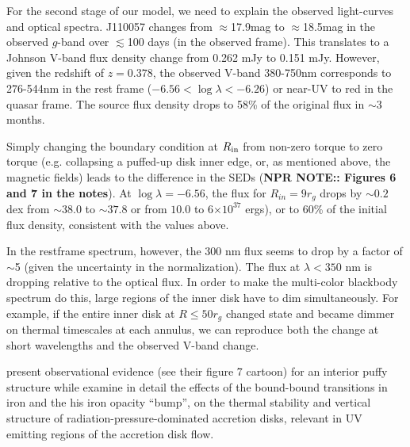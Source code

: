 \documentclass[11pt,a4paper]{article}
\begin{document}
For the second stage of our model, we need to explain the
observed light-curves and optical spectra. J110057 changes from
$\approx$17.9mag to $\approx$18.5mag in the observed $g$-band over
$\lesssim$100 days (in the observed frame).  This translates to a
Johnson V-band flux density change from 0.262 mJy to 0.151 mJy.
However, given the redshift of $z=0.378$, the observed V-band
380-750nm corresponds to 276-544nm in the rest frame ($-6.56 < \log
\lambda < -6.26$) or near-UV to red in the quasar frame. The source
flux density drops to 58\% of the original flux in $\sim$3 months.

Simply changing the boundary condition at $R_{\rm in}$ from non-zero
torque to zero torque (e.g. collapsing a puffed-up disk inner edge,
or, as mentioned above, the magnetic fields) leads to the difference
in the SEDs ({\bf NPR NOTE:: Figures 6 and 7 in the notes}).  At $\log
\lambda = −6.56$, the flux for $R_{in} = 9 r_{g}$ %
drops by $\sim0.2$ dex from $\sim38.0$ to $\sim37.8 $ or from $10.0$
to 6$\times 10^{37}$ ergs), or to 60\% of the initial flux density,
consistent with the values above.

In the restframe spectrum, however, the 300 nm flux seems to drop by a
factor of $\sim$5 (given the uncertainty in the normalization). The
flux at $\lambda < 350$ nm is dropping relative to the optical
flux. In order to make the multi-color blackbody spectrum do this, 
large regions of the  inner disk have to dim simultaneously. 
For example, if the entire inner disk at $R \leq 50 r_{g}$ changed state
and became dimmer on thermal timescales at each annulus, we can
reproduce both the change at short wavelengths and the observed V-band
change.

\citet{Gardner_Done2017} present observational evidence (see their
figure 7 cartoon) for an interior puffy structure while
\citet{Jiang_Stone_Davis2016} examine in detail the effects of the
bound-bound transitions in iron and the his iron opacity ``bump'', on
the thermal stability and vertical structure of
radiation-pressure-dominated accretion disks, relevant in UV emitting
regions of the accretion disk flow.
\end{document}
